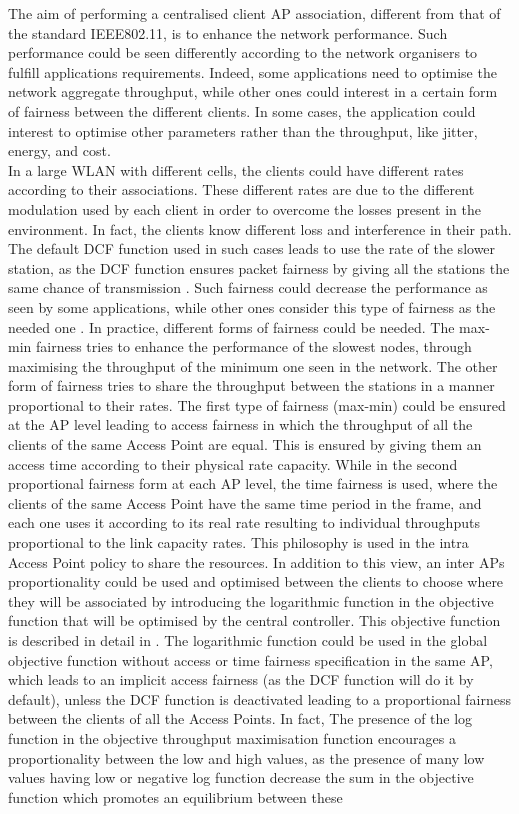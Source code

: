 \documentclass[journal,transmag]{IEEEtran}
\begin{document}
The aim of performing a centralised client AP association, different from that of the standard IEEE802.11, is to enhance the network performance. Such performance could be seen differently according to the network organisers to fulfill applications requirements. Indeed, some applications need to optimise the network aggregate throughput, while other ones could interest in a certain form of fairness between the different clients. In some cases, the application could interest to optimise other parameters rather than the throughput, like jitter, energy, and cost. \\
In a large WLAN with different cells, the clients could have different rates according to their associations. These different rates are due to the different modulation used by each client in order to overcome the losses present in the environment. In fact, the clients know different loss and interference in their path. The default DCF function used in such cases leads to use the rate of the slower station, as the DCF function ensures packet fairness by giving all the stations the same chance of transmission \cite{03performance_anomaly_DCF}. Such fairness could decrease the performance as seen by some applications, while other ones consider this type of fairness as the needed one \cite{05performance_time_throughput_fairness}. In practice, different forms of fairness could be needed. The max-min fairness tries to enhance the performance of the slowest nodes, through maximising the throughput of the minimum one seen in the network. The other form of fairness tries to share the throughput between the stations in a manner proportional to their rates. The first type of fairness (max-min) could be ensured at the AP level leading to access fairness in which the throughput of all the clients of the same Access Point are equal. This is ensured by giving them an access time according to their physical rate capacity. While in the second proportional fairness form at each AP level, the time fairness is used, where the clients of the same Access Point have the same time period in the frame, and each one uses it according to its real rate resulting to individual throughputs proportional to the link capacity rates. This philosophy is used in the intra Access Point policy to share the resources. In addition to this view, an inter APs proportionality could be used and optimised between the clients to choose where they will be associated by introducing the logarithmic function in the objective function that will be optimised by the central controller. This objective function is described in detail in \cite{97kelly_elastic_rate}. The logarithmic function could be used in the global objective function without access or time fairness specification in the same AP, which leads to an implicit access fairness (as the DCF function will do it by default), unless the DCF function is deactivated leading to a proportional fairness between the clients of all the Access Points. In fact, The presence of the log function in the objective throughput maximisation function encourages a proportionality between the low and high values, as the presence of many low values having low or negative log function decrease the sum in the objective function which promotes an equilibrium between these 
\end{document}
